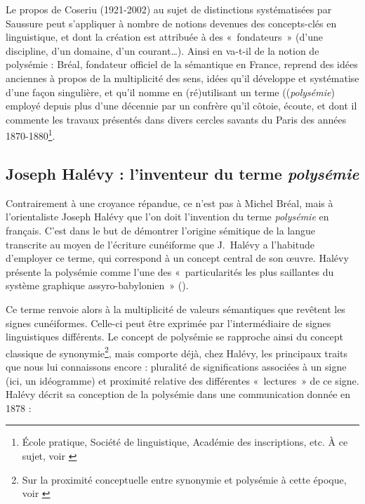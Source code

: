 \documentclass[output=paper]{langsci/langscibook}
\begin{document}
Le propos de Coseriu (1921-2002) au sujet de distinctions systématisées par Saussure peut s’appliquer à nombre de notions devenues des concepts-clés en linguistique, et dont la création est attribuée à des «~fondateurs~» (d’une discipline, d’un domaine, d’un courant…). Ainsi en va-t-il de la notion de polysémie : Bréal, fondateur officiel de la sémantique en France, reprend des idées anciennes à propos de la multiplicité des sens, idées qu’il développe et systématise d’une façon singulière, et qu’il nomme en (ré)utilisant un terme ((\textit{polysémie}) employé depuis plus d’une décennie par un confrère qu’il côtoie, écoute, et dont il commente les travaux présentés dans divers cercles savants du Paris des années 1870-1880\footnote{ \textrm{École pratique, Société de linguistique, Académie des inscriptions, etc. À ce sujet, voir \citealt{courbon_sur_2015}}}.

\subsection{Joseph Halévy : l’inventeur du terme \textit{polysémie}}

Contrairement à une croyance répandue, ce n’est pas à Michel Bréal, mais à l’orientaliste Joseph Halévy que l’on doit l’invention du terme \textit{polysémie} en français. C’est dans le but de démontrer l’origine sémitique de la langue transcrite au moyen de l’écriture cunéiforme que J.~Halévy a l’habitude d’employer ce terme, qui correspond à un concept central de son œuvre. Halévy présente la polysémie comme l’une des «~particularités les plus saillantes du système graphique assyro-babylonien~» (\citealt[298]{halevy_recherches_1876}).

Ce terme renvoie alors à la multiplicité de valeurs sémantiques que revêtent les signes cunéiformes. Celle-ci peut être exprimée par l’intermédiaire de signes linguistiques différents. Le concept de polysémie se rapproche ainsi du concept classique de synonymie\footnote{ \textrm{Sur la proximité conceptuelle entre synonymie et polysémie à cette époque, voir \citealt{delesalle_statut_1986}}}, mais comporte déjà, chez Halévy, les principaux traits que nous lui connaissons encore : pluralité de significations associées à un signe (ici, un idéogramme) et proximité relative des différentes «~lectures~» de ce signe. Halévy décrit sa conception de la polysémie dans une communication donnée en 1878 :
\end{document}
